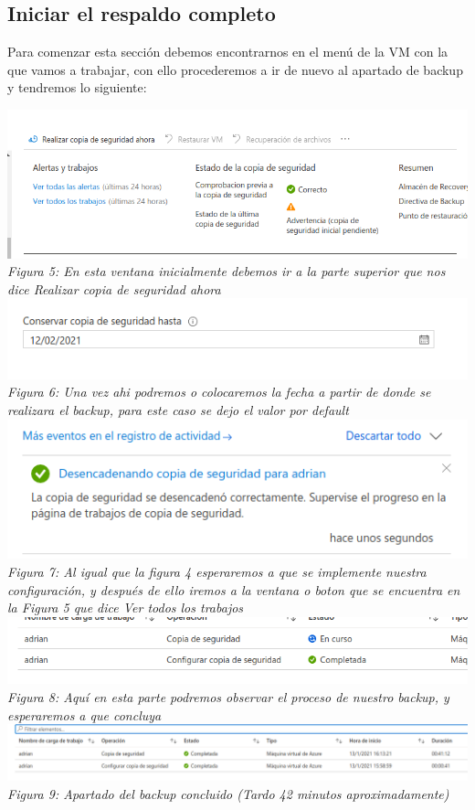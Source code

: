 \documentclass[10pt,executivepaper]{article}
\begin{document}
\subsection{Iniciar el respaldo completo}
Para comenzar esta sección debemos encontrarnos en el menú de la VM con la que vamos a trabajar, con ello procederemos a ir de nuevo al apartado de backup y tendremos lo siguiente:
\begin{center}
  \includegraphics[scale=0.5]{imgs/5.png}\\
  \textit{Figura 5: En esta ventana inicialmente debemos ir a la parte superior que nos dice Realizar copia de seguridad ahora}\\
  \includegraphics[scale=0.5]{imgs/6.png}\\
  \textit{Figura 6: Una vez ahi podremos o colocaremos la fecha a partir de donde se realizara el backup, para este caso se dejo el valor por default}\\
  \includegraphics[scale=0.5]{imgs/7.png}\\
  \textit{Figura 7: Al igual que la figura 4 esperaremos a que se implemente nuestra configuración, y después de ello iremos a la ventana o boton que se encuentra en la Figura 5 que dice Ver todos los trabajos}\\
  \includegraphics[scale=0.5]{imgs/8.png}\\
  \textit{Figura 8: Aquí en esta parte podremos observar el proceso de nuestro backup, y esperaremos a que concluya}\\
  \includegraphics[scale=0.35]{imgs/9.png}\\
  \textit{Figura 9: Apartado del backup concluido (Tardo 42 minutos aproximadamente)}
\end{center}
\end{document}
